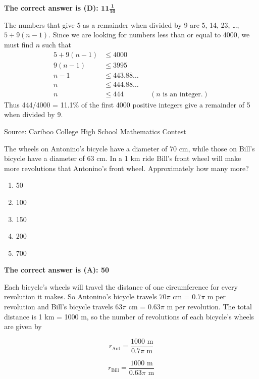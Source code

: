 \documentclass{article}
\begin{document}
\textbf{The correct answer is (D): $\mathbf{11\frac{1}{10}}$}

The numbers that give 5 as a remainder when divided by 9 are 5, 14, 23, \ldots, \mbox{$5+9(n-1)$}. Since we are looking for numbers less than or equal to 4000, we must find $n$ such that
\begin{align*}
5+9(n-1) &\leq 4000\\
9(n-1) &\leq 3995\\
n-1 &\leq 443.88\ldots\\
n &\leq 444.88\ldots\\
n &\leq 444 &&(n\text{ is an integer.})
\end{align*}
Thus 444/4000 = 11.1\% of the first 4000 positive integers give a remainder of 5 when divided by 9.

\vskip 1.5cm


\scriptsize
Source: Cariboo College High School Mathematics Contest

\normalsize
The wheels on Antonino's bicycle have a diameter of 70 cm, while those on Bill's bicycle have a diameter of 63 cm. In a 1 km ride Bill's front wheel will make more revolutions that Antonino's front wheel. Approximately how many more?
\begin{enumerate}[noitemsep,topsep=0mm,leftmargin=*,widest=D,label=\Alph*)]
	\item 50
	\item 100
	\item 150
	\item 200
	\item 700
\end{enumerate}

\textbf{The correct answer is (A): 50}

Each bicycle's wheels will travel the distance of one circumference for every revolution it makes. So Antonino's bicycle travels $70\pi$ cm = $0.7\pi$ m per revolution and Bill's bicycle travels $63\pi$ cm = $0.63\pi$ m per revolution. The total distance is 1 km = 1000 m, so the number of revolutions of each bicycle's wheels are given by

\begin{minipage}{0.45\textwidth}
\[r_{\text{Ant}} = \frac{1000\text{ m}}{0.7\pi \text{ m}}\]
\end{minipage}
\begin{minipage}{0.45\textwidth}
\[r_{\text{Bill}} = \frac{1000\text{ m}}{0.63\pi \text{ m}}\]
\end{minipage}
\end{document}
